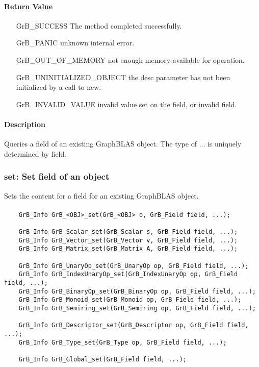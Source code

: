 \paragraph{Return Value}

\begin{itemize}[leftmargin=2.1in]
\item[{\sf GrB\_SUCCESS}]  The method completed successfully.
\item[{\sf GrB\_PANIC}]             unknown internal error.
\item[{\sf GrB\_OUT\_OF\_MEMORY}]          not enough memory available for operation.
\item[{\sf GrB\_UNINITIALIZED\_OBJECT}]          the {\sf desc} parameter has not been
                                    initialized by a call to {\sf new}.
\item[{\sf GrB\_INVALID\_VALUE}]    invalid value set on the field, or invalid field.
\end{itemize}

\paragraph{Description}

Queries a field of an existing GraphBLAS object. %
The type of {\sf ...} is uniquely determined by {\sf field}. %


\subsubsection{{\sf set}: Set field of an object}

Sets the content for a field for an existing GraphBLAS object.

\paragraph{\syntax}

\begin{verbatim}
    GrB_Info GrB_<OBJ>_set(GrB_<OBJ> o, GrB_Field field, ...);

    GrB_Info GrB_Scalar_set(GrB_Scalar s, GrB_Field field, ...);
    GrB_Info GrB_Vector_set(GrB_Vector v, GrB_Field field, ...);
    GrB_Info GrB_Matrix_set(GrB_Matrix A, GrB_Field field, ...);

    GrB_Info GrB_UnaryOp_set(GrB_UnaryOp op, GrB_Field field, ...);
    GrB_Info GrB_IndexUnaryOp_set(GrB_IndexUnaryOp op, GrB_Field field, ...);
    GrB_Info GrB_BinaryOp_set(GrB_BinaryOp op, GrB_Field field, ...);
    GrB_Info GrB_Monoid_set(GrB_Monoid op, GrB_Field field, ...);
    GrB_Info GrB_Semiring_set(GrB_Semiring op, GrB_Field field, ...);

    GrB_Info GrB_Descriptor_set(GrB_Descriptor op, GrB_Field field, ...);
    GrB_Info GrB_Type_set(GrB_Type op, GrB_Field field, ...);

    GrB_Info GrB_Global_set(GrB_Field field, ...);
\end{verbatim}

